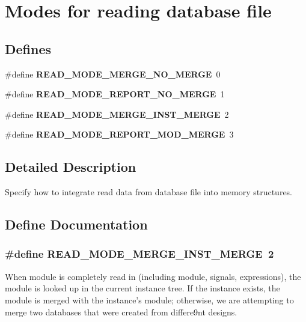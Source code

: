 \section{Modes for reading database file}
\label{group__read__modes}
\subsection*{Defines}
\begin{CompactItemize}
\item 
\#define {\bf READ\_\-MODE\_\-MERGE\_\-NO\_\-MERGE}\ 0
\item 
\#define {\bf READ\_\-MODE\_\-REPORT\_\-NO\_\-MERGE}\ 1
\item 
\#define {\bf READ\_\-MODE\_\-MERGE\_\-INST\_\-MERGE}\ 2
\item 
\#define {\bf READ\_\-MODE\_\-REPORT\_\-MOD\_\-MERGE}\ 3
\end{CompactItemize}


\subsection{Detailed Description}
Specify how to integrate read data from database file into memory structures. 

\subsection{Define Documentation}
\subsubsection{\setlength{\rightskip}{0pt plus 5cm}\#define READ\_\-MODE\_\-MERGE\_\-INST\_\-MERGE\ 2}\label{group__read__modes_a2}


When module is completely read in (including module, signals, expressions), the module is looked up in the current instance tree. If the instance exists, the module is merged with the instance's module; otherwise, we are attempting to merge two databases that were created from differe9nt designs. 
